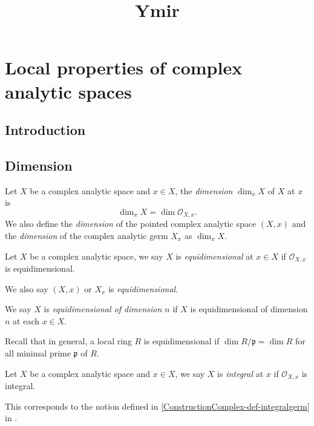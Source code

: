 
\title{Ymir}

\maketitle
\tableofcontents

\chapter*{Local properties of complex analytic spaces}\label{chap-propcomplex}

\section{Introduction}\label{sec-introduction-propertycomplex}


\section{Dimension}

\begin{definition}
    Let $X$ be a complex analytic space and $x\in X$, the \emph{dimension} $\dim_x X$ of $X$ at $x$ is 
    \[
        \dim_x X=\dim \mathcal{O}_{X,x}.
    \]
    We also define the \emph{dimension} of the pointed complex analytic space $(X,x)$ and the \emph{dimension} of the complex analytic germ $X_x$ as $\dim_x X$.
\end{definition}

\begin{definition}
    Let $X$ be a complex analytic space, we say $X$ is \emph{equidimensional} at $x\in X$ if $\mathcal{O}_{X,x}$ is equidimensional.

    We also say $(X,x)$ or $X_x$ is \emph{equidimensional}.

    We say $X$ is \emph{equidimensional of dimension $n$} if $X$ is equidimensional of dimension $n$ at each $x\in X$.
\end{definition}
Recall that in general, a local ring $R$ is equidimensional if $\dim R/\mathfrak{p}=\dim R$ for all minimal prime $\mathfrak{p}$ of $R$.

\begin{definition}
    Let $X$ be a complex analytic space and $x\in X$, we say $X$ is \emph{integral} at $x$ if $\mathcal{O}_{X,x}$ is integral.
\end{definition}
This corresponds to the notion defined in \cref{ConstructionComplex-def-integralgerm} in .

